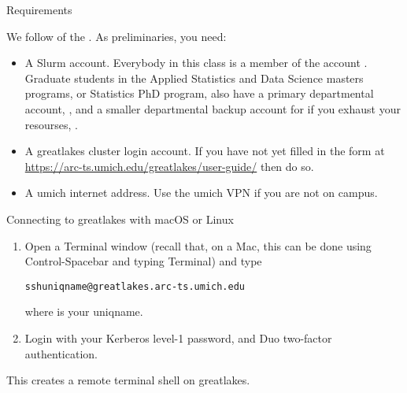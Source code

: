 \begin{frame}{Requirements}

We follow  of the . As preliminaries, you need:

\begin{itemize}
  \item A Slurm account. Everybody in this class is a member of the account . Graduate students in the Applied Statistics and Data Science masters programs, or Statistics PhD program, also have a primary departmental account, , and a smaller departmental backup account for if you exhaust your resourses, . 
   \item A greatlakes cluster login account. If you have not yet filled in the form at \url{https://arc-ts.umich.edu/greatlakes/user-guide/} then do so.
   \item A umich internet address. Use the umich VPN if you are not on campus.
  \end{itemize}
\end{frame}


\begin{frame}{Connecting to greatlakes with macOS or Linux}
  \begin{enumerate}
  \item Open a Terminal window (recall that, on a Mac, this can be done using Control-Spacebar and typing Terminal) and type
\begin{knitrout}\small
{}\color{fgcolor}\begin{kframe}
\begin{alltt}
ssh uniqname@greatlakes.arc-ts.umich.edu
\end{alltt}
\end{kframe}
\end{knitrout}
where  is your uniqname.
\item Login with your Kerberos level-1 password, and Duo two-factor authentication.
  \end{enumerate}
This creates a remote terminal shell on greatlakes.

\end{frame}



